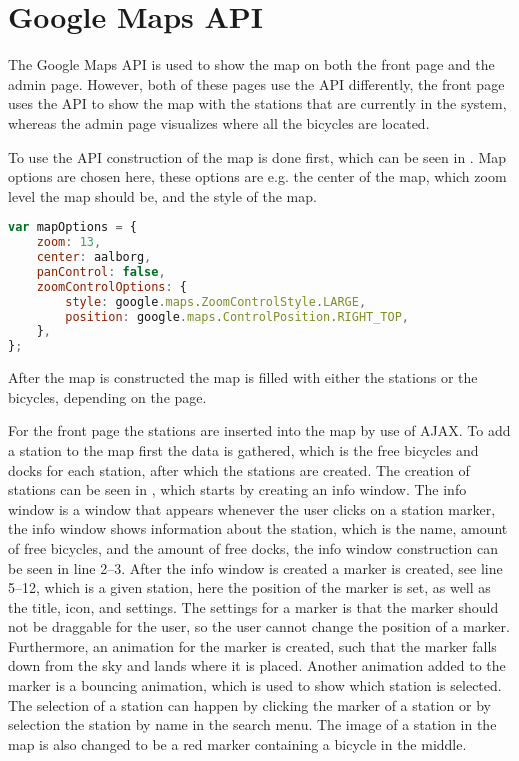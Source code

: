 \section{Google Maps API}
The Google Maps API \citep{misc:googlemapsapi} is used to show the map on both the front page and the admin page.
However, both of these pages use the API differently, the front page uses the API to show the map with the stations that are currently in the system, whereas the admin page visualizes where all the bicycles are located.

To use the API construction of the map is done first, which can be seen in .
Map options are chosen here, these options are e.g. the center of the map, which zoom level the map should be, and the style of the map.

\begin{minipage}{\textwidth}
\begin{lstlisting}[caption={Construction of the map}, label={lst:mapoptions}, language=Javascript]
var mapOptions = {
	zoom: 13,
	center: aalborg,
	panControl: false,
    zoomControlOptions: {
		style: google.maps.ZoomControlStyle.LARGE,
		position: google.maps.ControlPosition.RIGHT_TOP,
	},
};
\end{lstlisting}
\end{minipage}

After the map is constructed the map is filled with either the stations or the bicycles, depending on the page.

For the front page the stations are inserted into the map by use of AJAX.
To add a station to the map first the data is gathered, which is the free bicycles and docks for each station, after which the stations are created.
The creation of stations can be seen in , which starts by creating an info window.
The info window is a window that appears whenever the user clicks on a station marker, the info window shows information about the station, which is the name, amount of free bicycles, and the amount of free docks, the info window construction can be seen in line 2--3.
After the info window is created a marker is created, see line 5--12, which is a given station, here the position of the marker is set, as well as the title, icon, and settings.
The settings for a marker is that the marker should not be draggable for the user, so the user cannot change the position of a marker.
Furthermore, an animation for the marker is created, such that the marker falls down from the sky and lands where it is placed.
Another animation added to the marker is a bouncing animation, which is used to show which station is selected. The selection of a station can happen by clicking the marker of a station or by selection the station by name in the search menu.
The image of a station in the map is also changed to be a red marker containing a bicycle in the middle.

